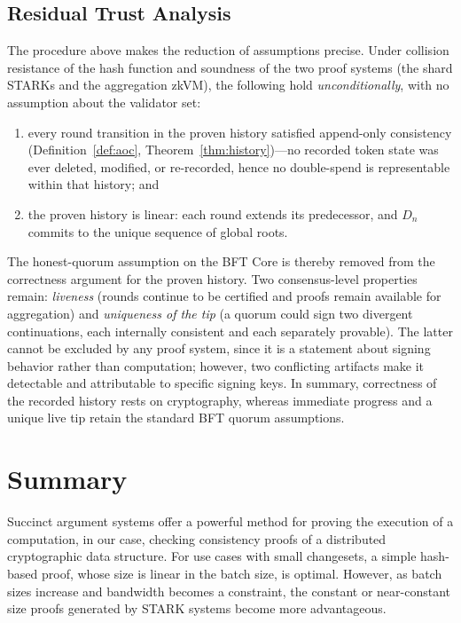 \documentclass[11pt]{article}
\begin{document}
\subsection{Residual Trust Analysis}
\label{sec:residual-trust}

The procedure above makes the reduction of assumptions precise. Under collision resistance of the hash function and soundness of the two proof systems (the shard STARKs and the aggregation zkVM), the following hold \emph{unconditionally}, with no assumption about the validator set:

\begin{enumerate}[nosep]
  \item every round transition in the proven history satisfied append-only consistency (Definition~\ref{def:aoc}, Theorem~\ref{thm:history})---no recorded token state was ever deleted, modified, or re-recorded, hence no double-spend is representable within that history; and
  \item the proven history is linear: each round extends its predecessor, and $D_n$ commits to the unique sequence of global roots.
\end{enumerate}

The honest-quorum assumption on the BFT Core is thereby removed from the correctness argument for the proven history. Two consensus-level properties remain: \emph{liveness} (rounds continue to be certified and proofs remain available for aggregation) and \emph{uniqueness of the tip} (a quorum could sign two divergent continuations, each internally consistent and each separately provable). The latter cannot be excluded by any proof system, since it is a statement about signing behavior rather than computation; however, two conflicting artifacts make it detectable and attributable to specific signing keys. In summary, correctness of the recorded history rests on cryptography, whereas immediate progress and a unique live tip retain the standard BFT quorum assumptions.

\section{Summary}

Succinct argument systems offer a powerful method for proving the execution of a computation, in our case, checking consistency proofs of a distributed cryptographic data structure. For use cases with small changesets, a simple hash-based proof, whose size is linear in the batch size, is optimal. However, as batch sizes increase and bandwidth becomes a constraint, the constant or near-constant size proofs generated by STARK systems become more advantageous.
\end{document}
